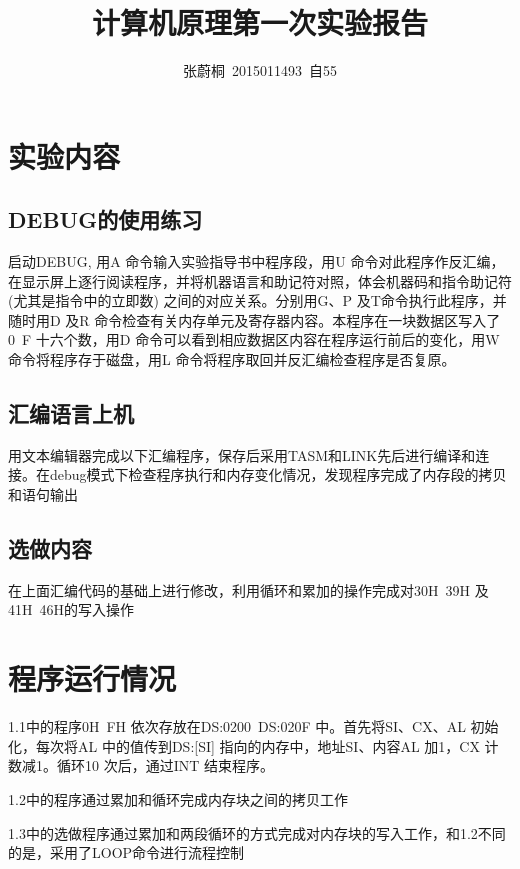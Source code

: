 \documentclass[UTF8,a4paper]{ctexart}
\title{计算机原理第一次实验报告}
\author{张蔚桐\ 2015011493\ 自55}
\begin{document}
\maketitle
\section{实验内容}
\subsection{DEBUG的使用练习}
启动DEBUG, 用A 命令输入实验指导书中程序段，用U 命令对此程序作反汇编，在显示屏上逐行阅读程序，并将机器语言和助记符对照，体会机器码和指令助记符(尤其是指令中的立即数) 之间的对应关系。分别用G、P 及T命令执行此程序，并随时用D 及R 命令检查有关内存单元及寄存器内容。本程序在一块数据区写入了0~F 十六个数，用D 命令可以看到相应数据区内容在程序运行前后的变化，用W 命令将程序存于磁盘，用L 命令将程序取回并反汇编检查程序是否复原。
\subsection{汇编语言上机}
用文本编辑器完成以下汇编程序，保存后采用TASM和LINK先后进行编译和连接。在debug模式下检查程序执行和内存变化情况，发现程序完成了内存段的拷贝和语句输出

\subsection{选做内容}
在上面汇编代码的基础上进行修改，利用循环和累加的操作完成对30H~39H 及41H~46H的写入操作

\section{程序运行情况}
1.1中的程序0H~FH 依次存放在DS:0200~DS:020F 中。首先将SI、CX、AL 初始化，每次将AL 中的值传到DS:[SI] 指向的内存中，地址SI、内容AL 加1，CX 计数减1。循环10 次后，通过INT 结束程序。

1.2中的程序通过累加和循环完成内存块之间的拷贝工作

1.3中的选做程序通过累加和两段循环的方式完成对内存块的写入工作，和1.2不同的是，采用了LOOP命令进行流程控制
\end{document}
